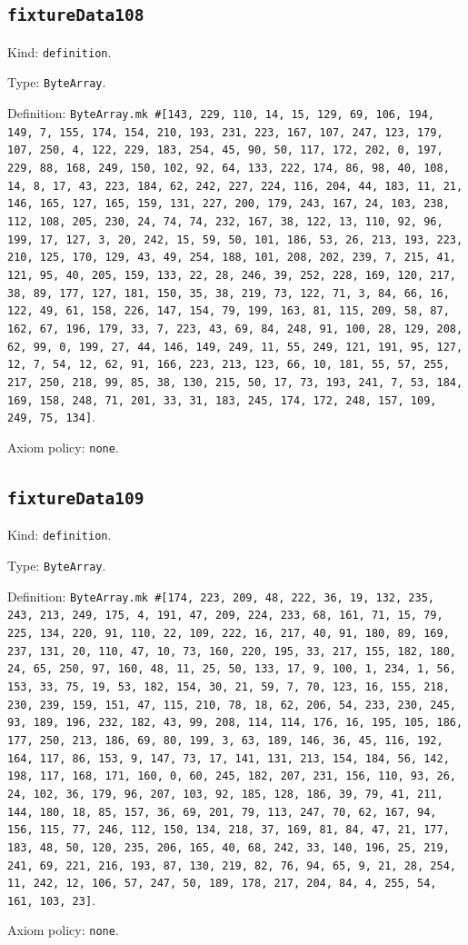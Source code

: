 \documentclass[11pt]{article}
\begin{document}
\subsection*{\texttt{fixtureData108}}
\noindent Kind: \texttt{definition}.\par
\noindent Type: \texttt{ByteArray}.\par
\noindent Definition: \texttt{ByteArray.mk \#[143, 229, 110, 14, 15, 129, 69, 106, 194, 149, 7, 155, 174, 154, 210, 193, 231, 223, 167, 107, 247, 123, 179, 107, 250, 4, 122, 229, 183, 254, 45, 90, 50, 117, 172, 202, 0, 197, 229, 88, 168, 249, 150, 102, 92, 64, 133, 222, 174, 86, 98, 40, 108, 14, 8, 17, 43, 223, 184, 62, 242, 227, 224, 116, 204, 44, 183, 11, 21, 146, 165, 127, 165, 159, 131, 227, 200, 179, 243, 167, 24, 103, 238, 112, 108, 205, 230, 24, 74, 74, 232, 167, 38, 122, 13, 110, 92, 96, 199, 17, 127, 3, 20, 242, 15, 59, 50, 101, 186, 53, 26, 213, 193, 223, 210, 125, 170, 129, 43, 49, 254, 188, 101, 208, 202, 239, 7, 215, 41, 121, 95, 40, 205, 159, 133, 22, 28, 246, 39, 252, 228, 169, 120, 217, 38, 89, 177, 127, 181, 150, 35, 38, 219, 73, 122, 71, 3, 84, 66, 16, 122, 49, 61, 158, 226, 147, 154, 79, 199, 163, 81, 115, 209, 58, 87, 162, 67, 196, 179, 33, 7, 223, 43, 69, 84, 248, 91, 100, 28, 129, 208, 62, 99, 0, 199, 27, 44, 146, 149, 249, 11, 55, 249, 121, 191, 95, 127, 12, 7, 54, 12, 62, 91, 166, 223, 213, 123, 66, 10, 181, 55, 57, 255, 217, 250, 218, 99, 85, 38, 130, 215, 50, 17, 73, 193, 241, 7, 53, 184, 169, 158, 248, 71, 201, 33, 31, 183, 245, 174, 172, 248, 157, 109, 249, 75, 134]}.\par
\noindent Axiom policy: \texttt{none}.\par
\subsection*{\texttt{fixtureData109}}
\noindent Kind: \texttt{definition}.\par
\noindent Type: \texttt{ByteArray}.\par
\noindent Definition: \texttt{ByteArray.mk \#[174, 223, 209, 48, 222, 36, 19, 132, 235, 243, 213, 249, 175, 4, 191, 47, 209, 224, 233, 68, 161, 71, 15, 79, 225, 134, 220, 91, 110, 22, 109, 222, 16, 217, 40, 91, 180, 89, 169, 237, 131, 20, 110, 47, 10, 73, 160, 220, 195, 33, 217, 155, 182, 180, 24, 65, 250, 97, 160, 48, 11, 25, 50, 133, 17, 9, 100, 1, 234, 1, 56, 153, 33, 75, 19, 53, 182, 154, 30, 21, 59, 7, 70, 123, 16, 155, 218, 230, 239, 159, 151, 47, 115, 210, 78, 18, 62, 206, 54, 233, 230, 245, 93, 189, 196, 232, 182, 43, 99, 208, 114, 114, 176, 16, 195, 105, 186, 177, 250, 213, 186, 69, 80, 199, 3, 63, 189, 146, 36, 45, 116, 192, 164, 117, 86, 153, 9, 147, 73, 17, 141, 131, 213, 154, 184, 56, 142, 198, 117, 168, 171, 160, 0, 60, 245, 182, 207, 231, 156, 110, 93, 26, 24, 102, 36, 179, 96, 207, 103, 92, 185, 128, 186, 39, 79, 41, 211, 144, 180, 18, 85, 157, 36, 69, 201, 79, 113, 247, 70, 62, 167, 94, 156, 115, 77, 246, 112, 150, 134, 218, 37, 169, 81, 84, 47, 21, 177, 183, 48, 50, 120, 235, 206, 165, 40, 68, 242, 33, 140, 196, 25, 219, 241, 69, 221, 216, 193, 87, 130, 219, 82, 76, 94, 65, 9, 21, 28, 254, 11, 242, 12, 106, 57, 247, 50, 189, 178, 217, 204, 84, 4, 255, 54, 161, 103, 23]}.\par
\noindent Axiom policy: \texttt{none}.\par
\end{document}

